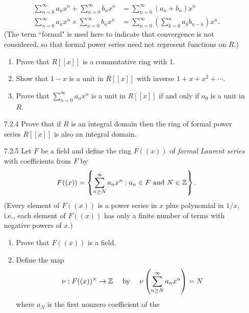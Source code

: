 \begin{enumerate}
\begin{align*}
                     \sum_{n=0}^\infty a_nx^n + \sum_{n=0}^\infty b_nx^n &=
                        \sum_{n=0}^\infty (a_n + b_n)x^n \\
                     \sum_{n=0}^\infty a_nx^n \times \sum_{n=0}^\infty b_nx^n &=
                        \sum_{n=0}^\infty\left(\sum_{k=0}^na_kb_{n-k}\right)x^n. 
                  \end{align*}
                  (The term ``formal" is used here to indicate that convergence
                  is not considered, so that formal power series need not
                  represent functions on $R$.)
                  \begin{enumerate}
                     \item Prove that $R[[x]]$ is a commutative ring with 1.
                     \item Show that $1- x$ is a unit in $R[[x]]$ with inverse
                           $1 + x + x^2 + \cdots$.
                     \item Prove that $\sum_{n=0}^\infty a_nx^n$ is a unit in
                           $R[[x]]$ if and only if $a_0$ is a unit in $R$.
                  \end{enumerate}
   \item[7.2.4]   Prove that if $R$ is an integral domain then the ring of
                  formal power series $R[[x]]$ is also an integral domain.
   \item[7.2.5]   Let $F$ be a field and define the ring $F((x))$ of
                  \textit{formal Laurent series} with coefficients from $F$ by
                  $$F((x)) = \left\{\sum_{n \ge N}^\infty a_nx^n : a_n \in F
                    \text{ and } N \in \mathbb{Z}\right\}.$$
                  (Every element of $F((x))$ is a power series in $x$ plus
                  polynomial in $1/x$, i.e., each element of $F((x))$ has only a
                  finite number of terms with negative powers of $x$.)
                  \begin{enumerate}
                     \item Prove that $F((x))$ is a field.
                     \item Define the map
                           $$\nu : F((x))^\times \rightarrow \mathbb{Z} \quad\text{ by }
                             \quad\nu\left(\sum_{n \ge N}^\infty
                              a_nx^n\right) = N$$
                           where $a_N$ is the first nonzero coefficient of the

\end{enumerate}
\end{enumerate}
